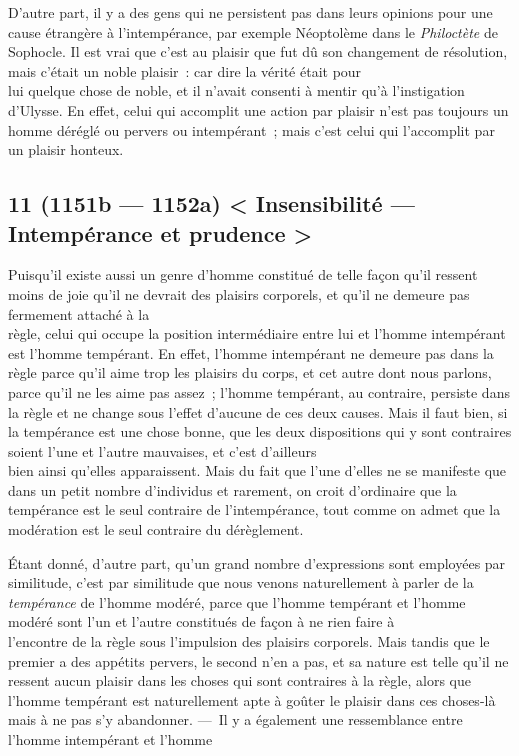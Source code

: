 \documentclass[french,twoside]{book} %
\begin{document}
D’autre part, il y a des gens qui ne persistent pas dans leurs opinions pour une cause étrangère à l’intempérance, par exemple Néoptolème dans le {\itshape Philoctète} de Sophocle. Il est vrai que c’est au plaisir que fut dû son changement de résolution, mais c’était un noble plaisir : car dire la vérité était pour \\
lui quelque chose de noble, et il n’avait consenti à mentir qu’à l’instigation d’Ulysse. En effet, celui qui accomplit une action par plaisir n’est pas toujours un homme déréglé ou pervers ou intempérant ; mais c’est celui qui l’accomplit par un plaisir honteux.
\subsection[{11 (1151b — 1152a) < Insensibilité — Intempérance et prudence >}]{11 (1151b — 1152a) < Insensibilité — Intempérance et prudence >}
\noindent Puisqu’il existe aussi un genre d’homme constitué de telle façon qu’il ressent moins de joie qu’il ne devrait des plaisirs corporels, et qu’il ne demeure pas fermement attaché à la \\
règle, celui qui occupe la position intermédiaire entre lui et l’homme intempérant est l’homme tempérant. En effet, l’homme intempérant ne demeure pas dans la règle parce qu’il aime trop les plaisirs du corps, et cet autre dont nous parlons, parce qu’il ne les aime pas assez ; l’homme tempérant, au contraire, persiste dans la règle et ne change sous l’effet d’aucune de ces deux causes. Mais il faut bien, si la tempérance est une chose bonne, que les deux dispositions qui y sont contraires soient l’une et l’autre mauvaises, et c’est d’ailleurs \\
bien ainsi qu’elles apparaissent. Mais du fait que l’une d’elles ne se manifeste que dans un petit nombre d’individus et rarement, on croit d’ordinaire que la tempérance est le seul contraire de l’intempérance, tout comme on admet que la modération est le seul contraire du dérèglement.\par
Étant donné, d’autre part, qu’un grand nombre d’expressions sont employées par similitude, c’est par similitude que nous venons naturellement à parler de la {\itshape tempérance} de l’homme modéré, parce que l’homme tempérant et l’homme modéré sont l’un et l’autre constitués de façon à ne rien faire à \\
l’encontre de la règle sous l’impulsion des plaisirs corporels. Mais tandis que le premier a des appétits pervers, le second  n’en a pas, et sa nature est telle qu’il ne ressent aucun plaisir dans les choses qui sont contraires à la règle, alors que l’homme tempérant est naturellement apte à goûter le plaisir dans ces choses-là mais à ne pas s’y abandonner. — Il y a également une ressemblance entre l’homme intempérant et l’homme \\
\end{document}

